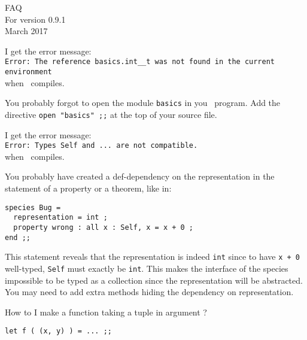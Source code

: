 \documentclass[10pt,a4paper]{article}
\begin{document}
\begin{center}
  {\Huge \textbf{\focal} FAQ}\\
  {\large For version 0.9.1}\\
  {March 2017}
\end{center}


\begin{faqitem}
I get the error message:\\
  \verb+Error: The reference basics.int__t was not found in the current+\\
  \verb+environment+\\
when \coq\ compiles.

\medskip
{}
You probably forgot to open the module {\tt basics} in you \focal\ program.
Add the directive \lstinline{open "basics" ;;} at the top of your source
file.
\end{faqitem}


\bigskip
\begin{faqitem}
I get the error message:\\
  \verb+Error: Types Self and ... are not compatible.+\\
when \focalizec\ compiles.

\medskip
{}
You probably have created a def-dependency on the
representation in the statement of a property or a theorem, like in:
{\small
\begin{lstlisting}
species Bug =
  representation = int ;
  property wrong : all x : Self, x = x + 0 ;
end ;;
\end{lstlisting}}


This statement reveals that the representation is indeed {\tt int} since to
have \lstinline"x + 0" well-typed, {\tt Self} must exactly be {\tt int}. This
makes the interface of the species impossible to be typed as a collection
since the representation will be abstracted. You may need to add extra methods
hiding the dependency on representation.
\end{faqitem}



\bigskip
\begin{faqitem}
How to I make a function taking a tuple in argument ?

\medskip
{}
\lstinline"let f ( (x, y) ) = ... ;;"
\end{faqitem}
\end{document}
